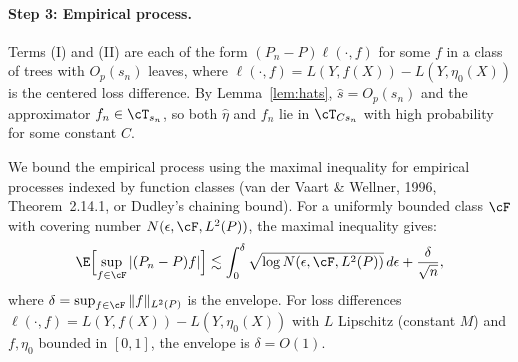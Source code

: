 


\paragraph{Step 3: Empirical process.}
Terms (I) and (II) are each of the form $(P_n - P)\ell(\cdot,f)$ for some $f$ in a class of trees with $O_p(s_n)$ leaves, where $\ell(\cdot,f) = L(Y,f(X)) - L(Y,\eta_0(X))$ is the centered loss difference. By Lemma~\ref{lem:hats}, $\hat{s} = O_p(s_n)$ and the approximator $f_n \in \cT_{s_n}$, so both $\hat\eta$ and $f_n$ lie in $\cT_{Cs_n}$ with high probability for some constant $C$.

We bound the empirical process using the maximal inequality for empirical processes indexed by function classes (van der Vaart \& Wellner, 1996, Theorem~2.14.1, or Dudley's chaining bound). For a uniformly bounded class $\cF$ with covering number $N(\epsilon, \cF, L^2(P))$, the maximal inequality gives:
\begin{equation}
\label{eq:maximal-ineq}
\E \Bigl[ \sup_{f \in \cF} |(P_n - P) f| \Bigr] \lesssim \int_0^\delta \sqrt{\log N(\epsilon, \cF, L^2(P))} \, d\epsilon + \frac{\delta}{\sqrt{n}},
\end{equation}
where $\delta = \sup_{f \in \cF} \|f\|_{L^2(P)}$ is the envelope. For loss differences $\ell(\cdot,f) = L(Y,f(X)) - L(Y,\eta_0(X))$ with $L$ Lipschitz (constant $M$) and $f, \eta_0$ bounded in $[0,1]$, the envelope is $\delta = O(1)$.

